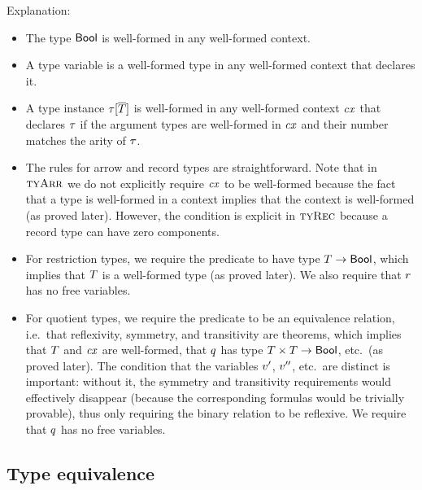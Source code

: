 Explanation:
\begin{itemize}
\item
The type $\mathsf{Bool}$ is well-formed in any well-formed context.
\item
A type variable is a well-formed type in any well-formed context that declares
it.
\item
A type instance $\tau[\overline{T}]$ is well-formed in any well-formed context $\mathit{cx}$ that
declares $\tau$ if the argument types are well-formed in $\mathit{cx}$ and their
number matches the arity of $\tau$.
\item
The rules for arrow and record types are straightforward. Note that in
$\textsc{tyArr}$ we do not explicitly require $\mathit{cx}$ to be well-formed because the fact
that a type is well-formed in a context implies that the context is
well-formed (as proved later). However, the condition is explicit in $\textsc{tyRec}$
because a record type can have zero components.
\item
For restriction types, we require the predicate to have type
$T\to\mathsf{Bool}$, which implies that $T$ is a well-formed type (as
proved later). We also require that $r$ has no free variables.
\item
For quotient types, we require the predicate to be an equivalence relation,
i.e.\ that reflexivity, symmetry, and transitivity are theorems, which implies
that $T$ and $\mathit{cx}$ are well-formed, that $q$ has type
$T\times T\to\mathsf{Bool}$, etc.\ (as proved later). The condition
that the variables $v'$, $v''$, etc.\ are distinct is important: without
it, the symmetry and transitivity requirements would effectively disappear
(because the corresponding formulas would be trivially provable), thus only
requiring the binary relation to be reflexive. We require that $q$ has
no free variables.
\end{itemize}

\subsection{Type equivalence}

